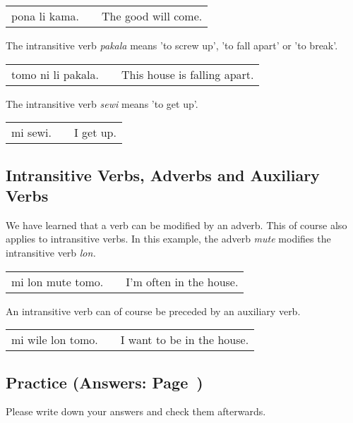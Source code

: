 \begin{supertabular}{p{5,5cm}|ll}
    pona li kama. &  & The good will come. \\
\end{supertabular}

The intransitive verb \textit{pakala} means 'to screw up', 'to fall apart' or 'to break'.

\begin{supertabular}{p{5,5cm}|ll}
    tomo ni li pakala. &  & This house is falling apart. \\
\end{supertabular}

The intransitive verb \textit{sewi} means 'to get up'.

\begin{supertabular}{p{5,5cm}|ll}
    mi sewi. &  & I get up. \\
\end{supertabular}

\newpage

\subsection*{Intransitive Verbs, Adverbs and Auxiliary Verbs}
We have learned that a verb can be modified by an adverb.
This of course also applies to intransitive verbs.
In this example, the adverb \textit{mute} modifies the intransitive verb \textit{lon.}

\begin{supertabular}{p{5,5cm}|ll}
    mi lon mute tomo. &  & I'm often in the house. \\
\end{supertabular}

An intransitive verb can of course be preceded by an auxiliary verb.

\begin{supertabular}{p{5,5cm}|ll}
    mi wile lon tomo. &  & I want to be in the house. \\
\end{supertabular}

\newpage

\subsection*{Practice (Answers: Page~\pageref{'indirect_objects'})}
Please write down your answers and check them afterwards.

